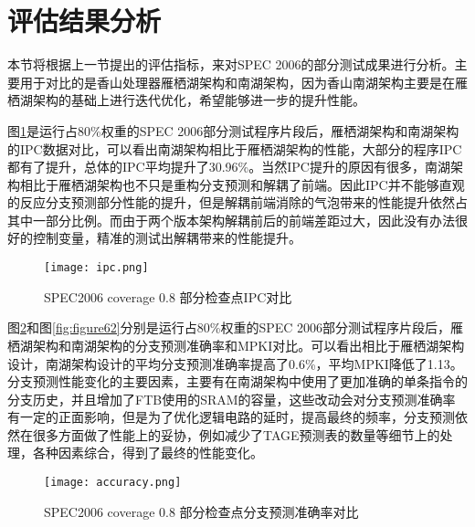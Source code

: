 \section{评估结果分析}

本节将根据上一节提出的评估指标，来对SPEC 2006的部分测试成果进行分析。主要用于对比的是香山处理器雁栖湖架构和南湖架构，因为香山南湖架构主要是在雁栖湖架构的基础上进行迭代优化，希望能够进一步的提升性能。

图\ref{fig:figure61}是运行占80\%权重的SPEC 2006部分测试程序片段后，雁栖湖架构和南湖架构的IPC数据对比，可以看出南湖架构相比于雁栖湖架构的性能，大部分的程序IPC都有了提升，总体的IPC平均提升了30.96\%。当然IPC提升的原因有很多，南湖架构相比于雁栖湖架构也不只是重构分支预测和解耦了前端。因此IPC并不能够直观的反应分支预测部分性能的提升，但是解耦前端消除的气泡带来的性能提升依然占其中一部分比例。而由于两个版本架构解耦前后的前端差距过大，因此没有办法很好的控制变量，精准的测试出解耦带来的性能提升。


\begin{figure}[H]
	\centering
	\setlength\tabcolsep{3pt}  %
	\vspace{5pt} %
	\texttt{[image: ipc.png]}
	\caption{SPEC2006 coverage 0.8 部分检查点IPC对比}
	\label{fig:figure61}
\end{figure}

图\ref{fig:figure64}和图\ref{fig:figure62}分别是运行占80\%权重的SPEC 2006部分测试程序片段后，雁栖湖架构和南湖架构的分支预测准确率和MPKI对比。可以看出相比于雁栖湖架构设计，南湖架构设计的平均分支预测准确率提高了0.6\%，平均MPKI降低了1.13。分支预测性能变化的主要因素，主要有在南湖架构中使用了更加准确的单条指令的分支历史，并且增加了FTB使用的SRAM的容量，这些改动会对分支预测准确率有一定的正面影响，但是为了优化逻辑电路的延时，提高最终的频率，分支预测依然在很多方面做了性能上的妥协，例如减少了TAGE预测表的数量等细节上的处理，各种因素综合，得到了最终的性能变化。

\begin{figure}[htb]
	\centering
	\setlength\tabcolsep{3pt}  %
	\vspace{5pt} %
	\texttt{[image: accuracy.png]}
	\caption{SPEC2006 coverage 0.8 部分检查点分支预测准确率对比}
	\label{fig:figure64}
\end{figure}



